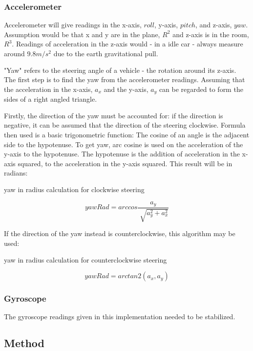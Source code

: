 \documentclass[12pt]{article}
\begin{document}
\subsubsection{Accelerometer}
Accelerometer will give readings in the x-axis, $roll$, y-axis, $pitch$, and z-axis, $yaw$. Assumption would be that x and y are in the plane, $R^2$ and z-axis is in the room, $R^3$. Readings of acceleration in the z-axis would - in a idle car - always measure around  $9.8 m/s^2$ due to the earth gravitational pull.

"Yaw" refers to the steering angle of a vehicle - the rotation around its z-axis. The first step is to find the yaw from the accelerometer readings. Assuming that the acceleration in the x-axis, $a_x$ and the y-axis, $a_y$ can be regarded to form the sides of a right angled triangle. 

Firstly, the direction of the yaw must be accounted for: if the direction is negative, it can be assumed that the direction of the steering clockwise. 
Formula then used is a basic trigonometric function: The cosine of an angle is the adjacent side to the hypotenuse. To get yaw, arc cosine is used on the acceleration of the y-axis to the hypotenuse. The hypotenuse is the addition of acceleration in the x-axis squared, to the acceleration in the y-axis squared. This result will be in radians:


\begin{algorithm}                 
    \caption{yaw in radius calculation for clockwise steering}    
		\[yawRad = arccos\frac{a_y}{\sqrt[]{a_y^2 + a_x^2}}\]
\end{algorithm}

If the direction of the yaw instead is counterclockwise, this algorithm may be used: 


\begin{algorithm}                 
    \caption{yaw in radius calculation for counterclockwise steering}    
		\[yawRad = arctan2(a_x,a_y)\]
\end{algorithm}

\subsubsection{Gyroscope}
The gyroscope readings given in this implementation needed to be stabilized. 
 

\subsection{Method}
\end{document}
